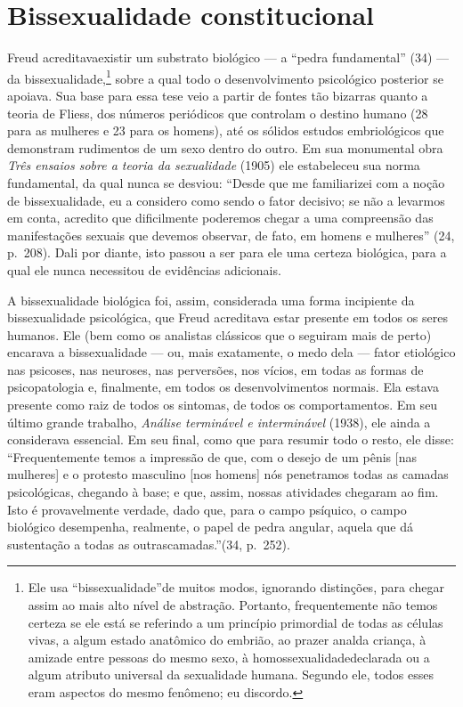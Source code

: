 \section{Bissexualidade constitucional}


  Freud acreditava\idxfreudanali[|(] existir um substrato biológico --- a ``pedra
fundamental'' (34) --- da bissexualidade,\footnote{ Ele usa
``bissexualidade''\idxbisse[|nn] de muitos modos, ignorando
distinções, para chegar assim ao mais alto nível de abstração.
Portanto, frequentemente não temos certeza se ele está se referindo a
um princípio primordial de todas as células vivas, a algum estado
anatômico do embrião, ao prazer anal\idxfanal[|nn] da criança, à amizade entre
pessoas do mesmo sexo, à homossexualidade\idxhomos[|nn] declarada ou a algum atributo
universal da sexualidade humana. Segundo ele, todos esses eram aspectos
do mesmo fenômeno; eu discordo.} sobre a qual todo o desenvolvimento
psicológico posterior se apoiava. Sua base para essa tese veio a partir
de fontes tão bizarras quanto a teoria de Fliess,\idxflies{} dos números
periódicos que controlam o destino humano (28 para as mulheres e 23
para os homens), até os sólidos estudos embriológicos que demonstram
rudimentos de um sexo dentro do outro. Em sua monumental obra
\textit{Três ensaios sobre a teoria da sexualidade}\idxfreudessay{} (1905) ele
estabeleceu sua norma fundamental, da qual nunca se desviou:
``Desde que me familiarizei com a noção de bissexualidade,\idxbisse{}
eu a considero como sendo o fator decisivo; se não a levarmos em conta,
 acredito que dificilmente poderemos chegar a uma compreensão das
manifestações sexuais que devemos observar, de fato, em homens e
mulheres'' (24, p.~208). Dali por diante, isto passou a
ser para ele uma certeza biológica, para a qual ele nunca necessitou de
evidências adicionais.

 A bissexualidade biológica foi, assim, considerada uma forma incipiente
da bissexualidade psicológica, que Freud acreditava estar presente em
todos os seres humanos. Ele (bem como os analistas clássicos que o
seguiram mais de perto) encarava a bissexualidade --- ou, mais
exatamente, o medo dela --- fator etiológico nas psicoses, nas neuroses,
nas perversões, nos vícios, em todas as formas de psicopatologia e,
finalmente, em todos os desenvolvimentos normais. Ela estava presente
como raiz de todos os sintomas, de todos os comportamentos. Em seu
último grande trabalho, \textit{Análise terminável e interminável}
(1938), ele ainda a considerava essencial. Em seu final, como que para
resumir todo o resto, ele disse: ``Frequentemente temos a
impressão de que, com o desejo de um\idxinvej{} pênis [nas mulheres] e o protesto
masculino [nos homens] nós penetramos todas as camadas psicológicas,
chegando à base; e que, assim, nossas atividades chegaram ao fim. Isto
é provavelmente verdade, dado que, para o campo psíquico, o campo
biológico desempenha, realmente, o papel de pedra angular, aquela que
dá sustentação a todas as outras\idxfreudanali[|)] camadas.''\idxfreud[|)] (34, p.~252).

